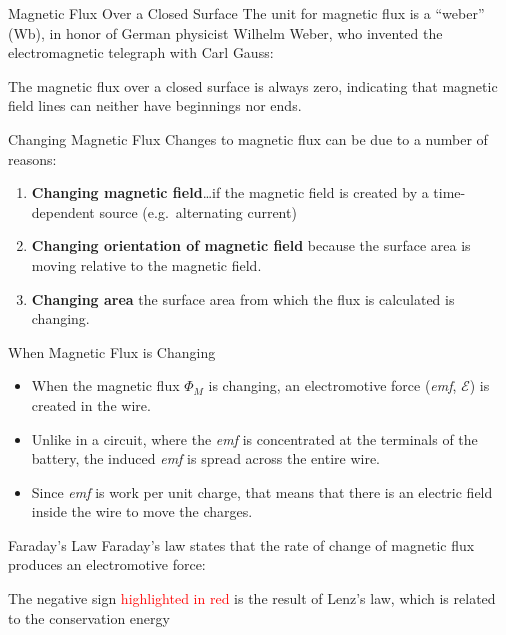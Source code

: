 \documentclass[12pt,aspectratio=169]{beamer}
\begin{document}
\begin{frame}{Magnetic Flux Over a Closed Surface}
  The unit for magnetic flux is a ``weber'' (\si{\weber}), in honor of German
  physicist Wilhelm Weber, who invented the electromagnetic telegraph with Carl
  Gauss:

  
  The magnetic flux over a closed surface is always zero,
  indicating that magnetic field lines can neither have beginnings nor ends.

\end{frame}


\begin{frame}{Changing Magnetic Flux}
  Changes to magnetic flux can be due to a number of reasons:
  \begin{enumerate}
  \item\textbf{Changing magnetic field}\ldots if the magnetic field is created
    by a time-dependent source (e.g.\ alternating current)
  \item\textbf{Changing orientation of magnetic field} because the
    surface area is moving relative to the magnetic field.
  \item\textbf{Changing area} the surface area from which the flux is
    calculated is changing.
  \end{enumerate}
\end{frame}



\begin{frame}{When Magnetic Flux is Changing}
  \begin{itemize}
  \item When the magnetic flux $\Phi_M$ is changing, an electromotive force
    (\emph{emf}, $\mathcal{E}$) is created in the wire.
  \item Unlike in a circuit, where the \emph{emf} is concentrated at the
    terminals of the battery, the induced \emph{emf} is spread across the
    entire wire.
    \item Since \emph{emf} is work per unit charge, that means that there is an
      electric field inside the wire to move the charges.
    \end{itemize}
\end{frame}


\begin{frame}{Faraday's Law}
  Faraday's law states that the rate of change of magnetic flux produces an
  electromotive force:

  
  The negative sign {\textcolor{red}{highlighted in red}} is the result of
  Lenz's law, which is related to the conservation energy
\end{frame}
\end{document}
